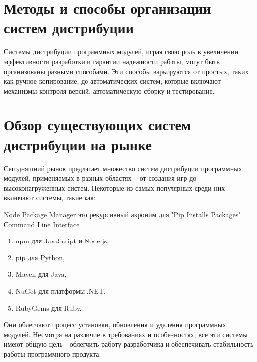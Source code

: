 \section{Методы и способы организации систем дистрибуции}

Системы дистрибуции программных модулей, играя свою роль в увеличении эффективности разработки и гарантии надежности работы, могут быть организованы разными способами. Эти способы варьируются от простых, таких как ручное копирование, до автоматических систем, которые включают механизмы контроля версий, автоматическую сборку и тестирование.

\section{Обзор существующих систем дистрибуции на рынке}

Сегодняшний рынок предлагает множество систем дистрибуции программных модулей, применяемых в разных областях – от создания игр до высоконагруженных систем. Некоторые из самых популярных среди них включают системы, такие как:



 {Node Package Manager}
 {это рекурсивный акроним для "Pip Installs Packages"}
 {Сommand Line Interface}

\begin{enumerate}
\item npm \cite{packages:npm} для JavaScript и Node.js,
\item pip \cite{packages:pip} для Python,
\item Maven \cite{packages:maven} для Java,
\item NuGet \cite{packages:nuget} для платформы .NET,
\item RubyGems \cite{packages:rubygems} для Ruby.
\end{enumerate}

Они облегчают процесс установки, обновления и удаления программных модулей. Несмотря на различие в требованиях и особенностях, все эти системы имеют общую цель - облегчить работу разработчика и обеспечивать стабильность работы программного продукта.

